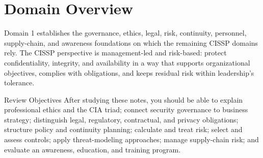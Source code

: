 \documentclass[10pt,letterpaper]{article}
\title{\CornellDocumentTitle}
\author{Arthur Deane and Aaron Kraus}
\date{\today}
\begin{document}
\maketitle

\section*{Domain Overview}
Domain 1 establishes the governance, ethics, legal, risk, continuity, personnel, supply-chain, and awareness foundations on which the remaining CISSP domains rely. The CISSP perspective is management-led and risk-based: protect confidentiality, integrity, and availability in a way that supports organizational objectives, complies with obligations, and keeps residual risk within leadership's tolerance.

\begin{summarybox}{Review Objectives}
After studying these notes, you should be able to explain professional ethics and the CIA triad; connect security governance to business strategy; distinguish legal, regulatory, contractual, and privacy obligations; structure policy and continuity planning; calculate and treat risk; select and assess controls; apply threat-modeling approaches; manage supply-chain risk; and evaluate an awareness, education, and training program.
\end{summarybox}
\end{document}
